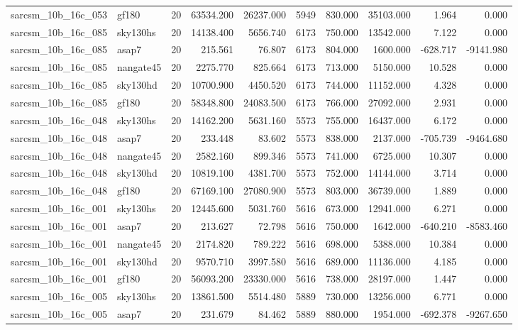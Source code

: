\documentclass{article}
\begin{document}
\begin{longtable}{llrrrrrrrr}
sarcsm\_10b\_16c\_053 & gf180 & 20 & 63534.200 & 26237.000 & 5949 & 830.000 & 35103.000 & 1.964 & 0.000 \\
sarcsm\_10b\_16c\_085 & sky130hs & 20 & 14138.400 & 5656.740 & 6173 & 750.000 & 13542.000 & 7.122 & 0.000 \\
sarcsm\_10b\_16c\_085 & asap7 & 20 & 215.561 & 76.807 & 6173 & 804.000 & 1600.000 & -628.717 & -9141.980 \\
sarcsm\_10b\_16c\_085 & nangate45 & 20 & 2275.770 & 825.664 & 6173 & 713.000 & 5150.000 & 10.528 & 0.000 \\
sarcsm\_10b\_16c\_085 & sky130hd & 20 & 10700.900 & 4450.520 & 6173 & 744.000 & 11152.000 & 4.328 & 0.000 \\
sarcsm\_10b\_16c\_085 & gf180 & 20 & 58348.800 & 24083.500 & 6173 & 766.000 & 27092.000 & 2.931 & 0.000 \\
sarcsm\_10b\_16c\_048 & sky130hs & 20 & 14162.200 & 5631.160 & 5573 & 755.000 & 16437.000 & 6.172 & 0.000 \\
sarcsm\_10b\_16c\_048 & asap7 & 20 & 233.448 & 83.602 & 5573 & 838.000 & 2137.000 & -705.739 & -9464.680 \\
sarcsm\_10b\_16c\_048 & nangate45 & 20 & 2582.160 & 899.346 & 5573 & 741.000 & 6725.000 & 10.307 & 0.000 \\
sarcsm\_10b\_16c\_048 & sky130hd & 20 & 10819.100 & 4381.700 & 5573 & 752.000 & 14144.000 & 3.714 & 0.000 \\
sarcsm\_10b\_16c\_048 & gf180 & 20 & 67169.100 & 27080.900 & 5573 & 803.000 & 36739.000 & 1.889 & 0.000 \\
sarcsm\_10b\_16c\_001 & sky130hs & 20 & 12445.600 & 5031.760 & 5616 & 673.000 & 12941.000 & 6.271 & 0.000 \\
sarcsm\_10b\_16c\_001 & asap7 & 20 & 213.627 & 72.798 & 5616 & 750.000 & 1642.000 & -640.210 & -8583.460 \\
sarcsm\_10b\_16c\_001 & nangate45 & 20 & 2174.820 & 789.222 & 5616 & 698.000 & 5388.000 & 10.384 & 0.000 \\
sarcsm\_10b\_16c\_001 & sky130hd & 20 & 9570.710 & 3997.580 & 5616 & 689.000 & 11136.000 & 4.185 & 0.000 \\
sarcsm\_10b\_16c\_001 & gf180 & 20 & 56093.200 & 23330.000 & 5616 & 738.000 & 28197.000 & 1.447 & 0.000 \\
sarcsm\_10b\_16c\_005 & sky130hs & 20 & 13861.500 & 5514.480 & 5889 & 730.000 & 13256.000 & 6.771 & 0.000 \\
sarcsm\_10b\_16c\_005 & asap7 & 20 & 231.679 & 84.462 & 5889 & 880.000 & 1954.000 & -692.378 & -9267.650 \\

\end{longtable}
\end{document}
